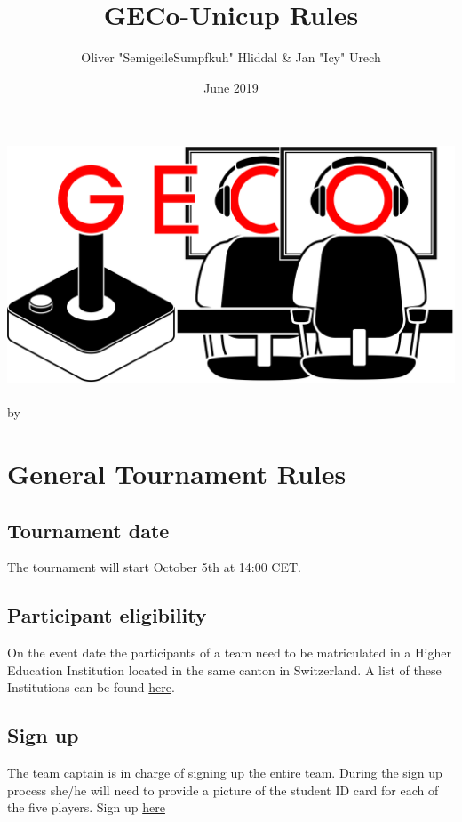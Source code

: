 \documentclass{article}
\title{GECo-Unicup Rules}
\author{Oliver "SemigeileSumpfkuh" Hliddal & Jan "Icy" Urech}
\date{June 2019}
\begin{document}
\makeatletter
\begin{titlepage}
\centering
\includegraphics[scale=0.075]{GECo.png}\\
\LARGE \@title\\ \normalsize by \@author\\ \@date
\end{titlepage}
\makeatother

\clearpage

\tableofcontents
\clearpage

\section{General Tournament Rules}
 

\subsection{Tournament date}
The tournament will start October 5th at 14:00 CET.

\subsection{Participant eligibility}
On the event date the participants of a team need to be matriculated in a Higher Education Institution located in the same canton in Switzerland. A list of these Institutions can be found \href{https://www.swissuniversities.ch/en/higher-education-area/recognised-swiss-higher-education-institutions/}{here}.

\subsection{Sign up}
The team captain is in charge of signing up the entire team.
During the sign up process she/he will need to provide a picture of the student ID card for each of the five players. Sign up \href{https://www.toornament.com/tournaments/2637580453799936000/information}{here}
\end{document}
